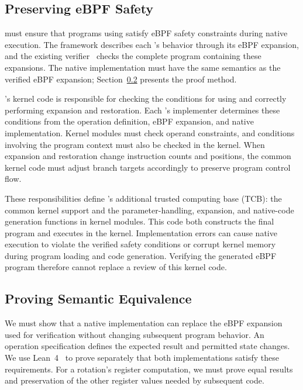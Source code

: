 \subsection{Preserving eBPF Safety}
\label{subsec:safety}

\tool must ensure that programs using \kinsns satisfy eBPF safety constraints during native execution. The framework describes each \kinsn's behavior through its eBPF expansion, and the existing verifier~\cite{verifier} checks the complete program containing these expansions. The native implementation must have the same semantics as the verified eBPF expansion; Section~\ref{sec:formal-verification} presents the proof method.

\tool's kernel code is responsible for checking the conditions for using \kinsns and correctly performing expansion and restoration. Each \kinsn's implementer determines these conditions from the operation definition, eBPF expansion, and native implementation. Kernel modules must check operand constraints, and conditions involving the program context must also be checked in the kernel. When expansion and restoration change instruction counts and positions, the common kernel code must adjust branch targets accordingly to preserve program control flow.

These responsibilities define \tool's additional trusted computing base (TCB): the common kernel support and the parameter-handling, expansion, and native-code generation functions in kernel modules. This code both constructs the final program and executes in the kernel. Implementation errors can cause native execution to violate the verified safety conditions or corrupt kernel memory during program loading and code generation. Verifying the generated eBPF program therefore cannot replace a review of this kernel code.

\subsection{Proving Semantic Equivalence}
\label{sec:formal-verification}

We must show that a native implementation can replace the eBPF expansion used for verification without changing subsequent program behavior. An operation specification defines the expected result and permitted state changes. We use Lean~4~\cite{moura2021lean} to prove separately that both implementations satisfy these requirements. For a rotation's register computation, we must prove equal results and preservation of the other register values needed by subsequent code.

